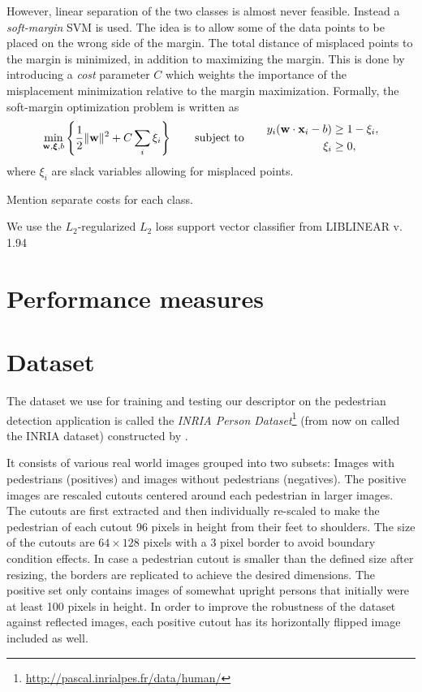 \documentclass[thesis.tex]{subfiles}
\begin{document}
However, linear separation of the two classes is almost never feasible. Instead a \emph{soft-margin} SVM is used. The idea is to allow some of the data points to be placed on the wrong side of the margin. The total distance of misplaced points to the margin is minimized, in addition to maximizing the margin. This is done by introducing a \emph{cost} parameter $C$ which weights the importance of the misplacement minimization relative to the margin maximization. Formally, the soft-margin optimization problem is written as
%
\begin{align*}
\min_{\mathbf{w},\boldsymbol{\xi},b} \left\{ \frac12 \| \mathbf{w} \|^2 + C \sum_i \xi_i \right\} \qquad \text{subject to} \qquad \begin{aligned} y_i (\mathbf{w} \cdot \mathbf{x}_i - b) &\geq 1 - \xi_i, \\ \xi_i &\geq 0, \end{aligned}
\end{align*}
%
where $\xi_i$ are slack variables allowing for misplaced points.

Mention separate costs for each class.

We use the $L_2$-regularized $L_2$ loss support vector classifier from LIBLINEAR v. 1.94 \cite{fan2008liblinear}

\section{Performance measures}

\section{Dataset}
\label{sec:odDataset}

The dataset we use for training and testing our descriptor on the pedestrian detection application is called the \emph{INRIA Person Dataset}\footnote{\url{http://pascal.inrialpes.fr/data/human/}} (from now on called the INRIA dataset) constructed by \citet{dalal2005histograms}.

It consists of various real world images grouped into two subsets: Images with pedestrians (positives) and images without pedestrians (negatives). The positive images are rescaled cutouts centered around each pedestrian in larger images. The cutouts are first extracted and then individually re-scaled to make the pedestrian of each cutout 96 pixels in height from their feet to shoulders. The size of the cutouts are $64 \times 128$ pixels with a 3 pixel border to avoid boundary condition effects. In case a pedestrian cutout is smaller than the defined size after resizing, the borders are replicated to achieve the desired dimensions.
The positive set only contains images of somewhat upright persons that initially were at least 100 pixels in height. In order to improve the robustness of the dataset against reflected images, each positive cutout has its horizontally flipped image included as well.
\end{document}
